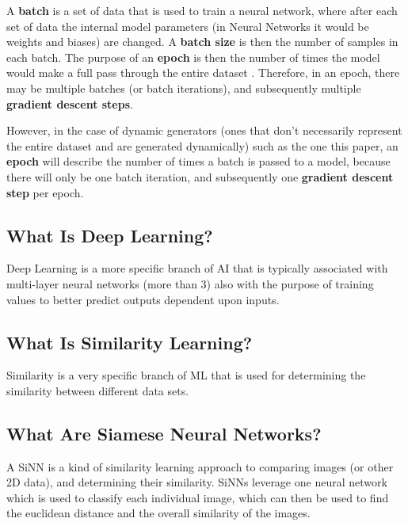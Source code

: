 \documentclass[
	letterpaper, %
	10pt, %
	unnumberedsections, %
	twoside, %
]{LTJournalArticle}
\begin{document}
A \textbf{batch} is a set of data that is used to train a neural network, where after each set of data the internal model parameters (in Neural Networks it would be weights and biases) are changed. A \textbf{batch size} is then the number of samples in each batch. The purpose of an \textbf{epoch} is then the number of times the model would make a full pass through the entire dataset \autocite{brownlee}.
Therefore, in an epoch, there may be multiple batches (or batch iterations), and subsequently multiple \textbf{gradient descent steps}.

However, in the case of dynamic generators (ones that don't necessarily represent the entire dataset and are generated dynamically) such as the one this paper, an \textbf{epoch} will describe the number of times a batch is passed to a model, because there will only be one batch iteration, and subsequently one \textbf{gradient descent step} per epoch.

\subsection{What Is Deep Learning?}
Deep Learning is a more specific branch of AI that is typically associated with multi-layer neural networks (more than 3) also with the purpose of training values to better predict outputs dependent upon inputs.

\subsection{What Is Similarity Learning?}
Similarity is a very specific branch of ML that is used for determining the similarity between different data sets\autocite{what_is_similarity_learning}.

\subsection{What Are Siamese Neural Networks?}
A SiNN is a kind of similarity learning approach to comparing images (or other 2D data), and determining their similarity. SiNNs leverage one neural network which is used to classify each individual image, which can then be used to find the euclidean distance and the overall similarity of the images.
\end{document}
